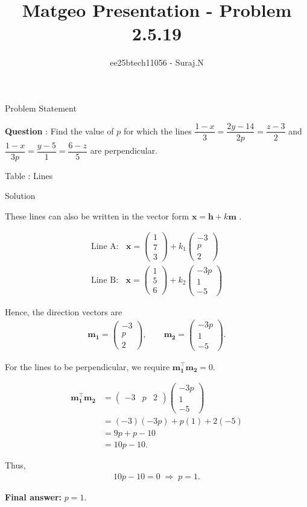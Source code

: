 \documentclass{beamer}
\title{Matgeo Presentation - Problem 2.5.19}
\author{ee25btech11056 - Suraj.N}
\numberwithin{equation}{section}
\theoremstyle{remark}
\newcommand{\myvec}[1]{\ensuremath{\begin{pmatrix}#1\end{pmatrix}}}
\let\vec\mathbf
\begin{document}
\begin{frame}
  \titlepage
\end{frame}

\begin{frame}{Problem Statement}

  \textbf{Question} : Find the value of $p$ for which the lines $\dfrac{1-x}{3}=\dfrac{2y-14}{2p}=\dfrac{z-3}{2}$ and $\dfrac{1-x}{3p}=\dfrac{y-5}{1}=\dfrac{6-z}{5}$ are perpendicular.

\begin{table}[h!]
  \centering
  
  \caption*{Table : Lines}
  \label{2.5.19}
\end{table}

\end{frame}

\begin{frame}{Solution}

  These lines can also be written in the vector form $\vec{x}=\vec{h}+k\vec{m}$ .

\begin{align*}
  \text{Line A: }\;\; \vec{x}=\myvec{1\\7\\3}+k_1\myvec{-3\\p\\2} \\
  \text{Line B: }\;\; \vec{x}=\myvec{1\\5\\6}+k_2\myvec{-3p\\1\\-5}
\end{align*}

Hence, the direction vectors are
\begin{align*}
  \vec{m_1}=\myvec{-3\\ p\\ 2}, \qquad
  \vec{m_2}=\myvec{-3p\\ 1\\ -5}.
\end{align*}

\end{frame}

\begin{frame}

  For the lines to be perpendicular, we require $\vec{m_1^\top} \vec{m_2}=0$.

\begin{align*}
  \vec{m_1^\top} \vec{m_2}
&= \myvec{-3 & p & 2}\myvec{-3p\\ 1\\ -5} \\
&= (-3)(-3p) + p(1) + 2(-5) \\
&= 9p + p - 10 \\
&= 10p - 10.
\end{align*}

Thus,
\begin{align*}
10p - 10 = 0 \;\Rightarrow\; p=1.
\end{align*}

\textbf{Final answer:} $p=1$.

\end{frame}
\end{document}
